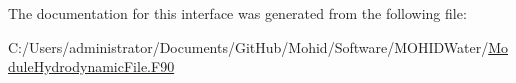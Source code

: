The documentation for this interface was generated from the following file\+:\begin{DoxyCompactItemize}
\item 
C\+:/\+Users/administrator/\+Documents/\+Git\+Hub/\+Mohid/\+Software/\+M\+O\+H\+I\+D\+Water/\mbox{\hyperlink{_module_hydrodynamic_file_8_f90}{Module\+Hydrodynamic\+File.\+F90}}\end{DoxyCompactItemize}
